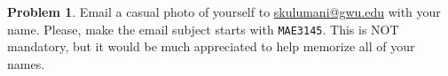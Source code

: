 \documentclass[10pt]{article}
\renewcommand{\baselinestretch}{1.2}
\theoremstyle{definition}
\newtheorem{prob}{Problem}[section]
\begin{document}
\begin{prob}
Email a casual photo of yourself to \url{skulumani@gwu.edu} with your name. Please, make the email subject starts with \texttt{MAE3145}.  This is NOT mandatory, but it would be much appreciated to help memorize all of your names. 
\end{prob}

%
%
%
%
\end{document}
